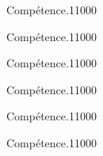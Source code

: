 \begin{pageParcourst} %

\begin{ExoCtN}{Compétence.}{1}{1}{0}{0}{0}
 
\end{ExoCtN}

\begin{ExoCtN}{Compétence.}{1}{1}{0}{0}{0}
 
\end{ExoCtN}

\begin{ExoCtN}{Compétence.}{1}{1}{0}{0}{0}
 
\end{ExoCtN}

\begin{ExoCtN}{Compétence.}{1}{1}{0}{0}{0}
 
\end{ExoCtN}

\begin{ExoCtN}{Compétence.}{1}{1}{0}{0}{0}
 
\end{ExoCtN}

\begin{ExoCtN}{Compétence.}{1}{1}{0}{0}{0}
 
\end{ExoCtN}
 
\end{pageParcourst} %


